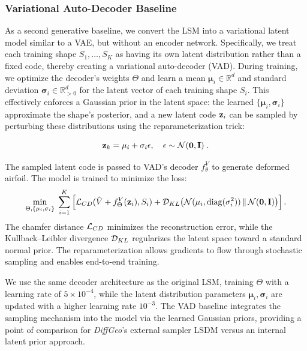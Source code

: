 \subsubsection{Variational Auto-Decoder Baseline}
As a second generative baseline, we convert the LSM into a variational latent model similar to a VAE, but without an encoder network. Specifically, we treat each training shape $S_1,\dots,S_K$ as having its own latent distribution rather than a fixed code, thereby creating a variational auto-decoder (VAD). During training, we optimize the decoder’s weights $\Theta$ and learn a mean $\mathbf{\mu}_i\in \mathbb{R}^d$ and standard deviation $\mathbf{\sigma}_i\in \mathbb{R}^d_{>0}$ for the latent vector of each training shape $S_i$. This effectively enforces a Gaussian prior in the latent space: the learned $\{\mathbf{\mu}_i, \mathbf{\sigma}_i\}$ approximate the shape’s posterior, and a new latent code $\mathbf{z}_i$ can be sampled by perturbing these distributions using the reparameterization trick:

\[\mathbf{z}_k=\mathbf{\mu}_i+\mathbf{\sigma}_i\mathbf{\epsilon}, \quad \mathbf{\epsilon\sim \mathcal{N}(\mathbf{0}, \mathbf{I})}\;.\]

The sampled latent code is passed to VAD's decoder $f^{V}_\theta$ to generate deformed airfoil. The model is trained to minimize the loss:
\begin{equation*}
    \min_{\Theta,\{\mathbf{\mu}_i, \mathbf{\sigma}_i\}} \;
  \sum_{i=1}^K \left[
    \mathcal{L}_{CD}(\hat{V}+f^V_{\Theta}(\mathbf{z}_i), S_i) 
    + \mathcal{D}_{KL}\bigl(\mathcal{N}(\mathbf{\mu}_i, \operatorname{diag}(\mathbf{\sigma}_i^2)) \,\|\, \mathcal{N}(\mathbf{0}, \mathbf{I})\bigr)
  \right].
\end{equation*}
The chamfer distance $\mathcal{L}_{CD}$ minimizes the reconstruction error, while the Kullback–Leibler divergence $\mathcal{D}_{KL}$ regularizes the latent space toward a standard normal prior. The reparameterization allows gradients to flow through stochastic sampling and enables end-to-end training.

We use the same decoder architecture as the original LSM, training $\Theta$ with a learning rate of $5\times10^{-4}$, while the latent distribution parameters ${\mathbf{\mu}_i,\mathbf{\sigma}_i}$ are updated with a higher learning rate $10^{-3}$. The VAD baseline integrates the sampling mechanism into the model via the learned Gaussian priors, providing a point of comparison for \textit{DiffGeo}’s external sampler LSDM versus an internal latent prior approach.

